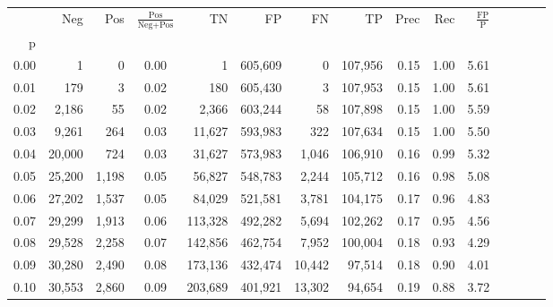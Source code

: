 \begin{tabular}{rrrcrrrrrrrrrrr}
\toprule
{} &     Neg &    Pos & $\frac{\text{Pos}}{\text{Neg}+\text{Pos}}$ &       TN &       FP &       FN &       TP &  Prec &   Rec & $\frac{\text{FP}}{\text{P}}$ \\
p    &         &        &                                            &          &          &          &          &       &       &                              \\
\midrule
0.00 &       1 &      0 &                                       0.00 &        1 &  605,609 &        0 &  107,956 &  0.15 &  1.00 &                         5.61 \\
0.01 &     179 &      3 &                                       0.02 &      180 &  605,430 &        3 &  107,953 &  0.15 &  1.00 &                         5.61 \\
0.02 &   2,186 &     55 &                                       0.02 &    2,366 &  603,244 &       58 &  107,898 &  0.15 &  1.00 &                         5.59 \\
0.03 &   9,261 &    264 &                                       0.03 &   11,627 &  593,983 &      322 &  107,634 &  0.15 &  1.00 &                         5.50 \\
0.04 &  20,000 &    724 &                                       0.03 &   31,627 &  573,983 &    1,046 &  106,910 &  0.16 &  0.99 &                         5.32 \\
0.05 &  25,200 &  1,198 &                                       0.05 &   56,827 &  548,783 &    2,244 &  105,712 &  0.16 &  0.98 &                         5.08 \\
0.06 &  27,202 &  1,537 &                                       0.05 &   84,029 &  521,581 &    3,781 &  104,175 &  0.17 &  0.96 &                         4.83 \\
0.07 &  29,299 &  1,913 &                                       0.06 &  113,328 &  492,282 &    5,694 &  102,262 &  0.17 &  0.95 &                         4.56 \\
0.08 &  29,528 &  2,258 &                                       0.07 &  142,856 &  462,754 &    7,952 &  100,004 &  0.18 &  0.93 &                         4.29 \\
0.09 &  30,280 &  2,490 &                                       0.08 &  173,136 &  432,474 &   10,442 &   97,514 &  0.18 &  0.90 &                         4.01 \\
0.10 &  30,553 &  2,860 &                                       0.09 &  203,689 &  401,921 &   13,302 &   94,654 &  0.19 &  0.88 &                         3.72 \\

\end{tabular}
